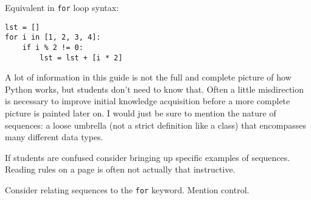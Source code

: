 \begin{blocksection}
Equivalent in \lstinline{for} loop syntax:

\begin{lstlisting}
lst = []
for i in [1, 2, 3, 4]:
    if i % 2 != 0:
        lst = lst + [i * 2]
\end{lstlisting}
\end{blocksection}

\begin{guide}
A lot of information in this guide is not the full and complete picture of how Python works, but students don't need to know that. Often a little misdirection is necessary to improve initial knowledge acquisition before a more complete picture is painted later on. I would just be sure to mention the nature of sequences: a loose umbrella (not a strict definition like a class) that encompasses many different data types. 

If students are confused consider bringing up specific examples of sequences. Reading rules on a page is often not actually that instructive. 

Consider relating sequences to the \lstinline{for} keyword. Mention control.
\end{guide}
